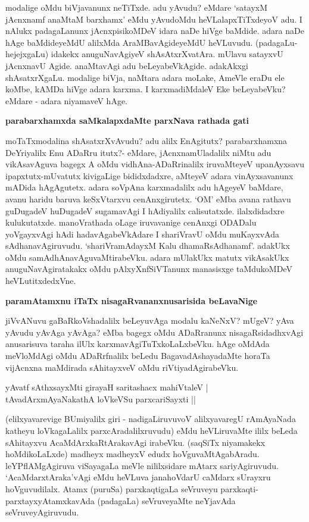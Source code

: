 \noindent
modalige oMdu biVjavanunx neTiTxde. adu yAvudu? eMdare `satayxM jAcnxnamf anaMtaM barxhamx' eMdu yAvudoMdu heVLalapxTiTxdeyoV adu. I nAlukx padagaLanunx jAcnxpisikoMDeV idara naDe hiVge baMdide. adara naDe hAge baMdideyeMdU alilxMda AraMBavAgideyeMdU heVLuvudu. (padagaLu-hejejxgaLu) idakekx anuguNavAgiyeV shAsAtxrXvatAra. mUlavu satayxvU jAcnxnavU Agide. anaMtavAgi adu beLeyabeVkAgide. adakAkxgi shAsatxrXgaLu. modalige biVja, naMtara adara moLake, AmeVle eraDu ele koMbe, kAMDa hiVge adara karxma. I karxmadiMdaleV Eke beLeyabeVku? eMdare - adara niyamaveV hAge.

{\bigskip
\noindent
{\large\bf parabarxhamxda saMkalapxdaMte parxNava rathada gati}}\label{page77}
\medskip

\noindent
moTaTxmodalina shAsatxrXvAvudu? adu alilx EnAgitutx? parabarxhamxna DeYriyalilx Enu ADaRru itutx?- eMdare, jAcnxnamUladalilx niMtu adu vikAsavAguva bagegx A oMdu vidhAna-ADaRrinalilx iruvaMteyeV upanAyxsavu ipapxtutx-mUvatutx kivigaLige bididxdadxre, aMteyeV adara vinAyxsavanunx mADida hAgAgutetx. adara soVpAna karxmadalilx adu hAgeyeV baMdare, avanu haridu baruva keSxVtarxvu cenAnxgirutetx. `OM' eMba avana rathavu guDugadeV huDugadeV sugamavAgi I hAdiyalilx calisutatxde. ilalxdidadxre kulukutatxde. manoVrathada oLage iruvavanige cenAnxgi ODADalu yoVgayxvAgi hAdi hadavAgabeVkAdare I shariVravU oMdu muKayxvAda sAdhanavAgiruvudu. `shariVramAdayxM Kalu\label{77} dhamaRsAdhanamf'. adakUkx oMdu samAdhAnavAguvaMtirabeVku. adara mUlakUkx matutx vikAsakUkx anuguNavAgiratakakx oMdu pAlxyXnfSiVTanunx manasisxge taMdukoMDeV heVLutitxdedxVne.

{\bigskip
\noindent
{\large\bf paramAtamxnu iTaTx nisagaRvananxnusarisida beLavaNige}}\label{page77a}
\medskip

\noindent
jiVvANuvu gaBaRkoVshadalilx beLeyuvAga modalu kaNeNxV? mUgeV? yAva yAvudu yAvAga yAvAga? eMba bagegx oMdu ADaRranunx nisagaRsidadhxvAgi anusarisuva taraha ilUlx karxmavAgiTuTxkoLaLxbeVku. hAge oMdAda meVloMdAgi oMdu ADaRrfnalilx beLedu BagavadAshayadaMte horaTa vijAcnxna maMdirada sAhitayxveV oMdu riVtiyadAgirabeVku.

\begin{shloka}
yAvatf sAthxsayxMti girayaH saritashacx mahiVtaleV |\\\label{77a}
tAvadArxmAyaNakathA loVkeVSu parxcariSayxti ||
\end{shloka}

\noindent
(elilxyavarevige BUmiyalilx giri - nadigaLiruvuvoV alilxyavaregU rAmAyaNada katheyu loVkagaLalilx parxcAradalilxruvudu) eMdu heVLiruvaMte ililx beLeda sAhitayxvu AcaMdArxkaRtArakavAgi irabeVku. (saqSiTx niyamakekx hoMdikoLaLxde) madheyx madheyxV edudx hoVguvaMtAgabAradu. leYPflAMgAgiruva viSayagaLa meVle nililxsidare mAtarx sariyAgiruvudu. `AcaMdarxtAraka'vAgi eMdu heVLuva janahoVdarU caMdarx sUrayxru hoVguvudilalx. Atamx (puruSa) parxkaqtigaLa seVruveyu parxkaqti-parxtayxyAtamxkavAda (padagaLa) seVruveyaMte neYjavAda seVruveyAgiruvudu. 

